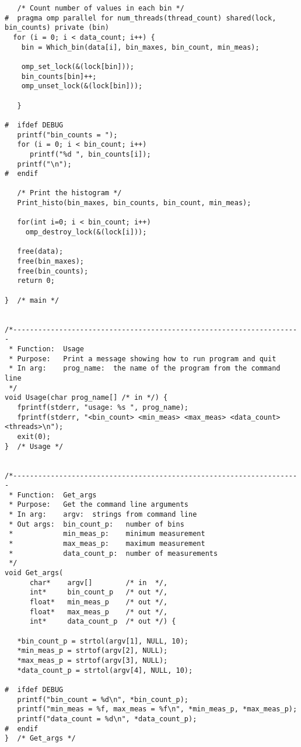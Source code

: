 \documentclass[a4paper,11pt,twoside]{article}
\begin{document}
\begin{verbatim}
   /* Count number of values in each bin */
#  pragma omp parallel for num_threads(thread_count) shared(lock, bin_counts) private (bin)
  for (i = 0; i < data_count; i++) {
    bin = Which_bin(data[i], bin_maxes, bin_count, min_meas);

    omp_set_lock(&(lock[bin])); 
    bin_counts[bin]++;
    omp_unset_lock(&(lock[bin]));
       
   }

#  ifdef DEBUG
   printf("bin_counts = ");
   for (i = 0; i < bin_count; i++)
      printf("%d ", bin_counts[i]);
   printf("\n");
#  endif

   /* Print the histogram */
   Print_histo(bin_maxes, bin_counts, bin_count, min_meas);

   for(int i=0; i < bin_count; i++)
     omp_destroy_lock(&(lock[i]));

   free(data);
   free(bin_maxes);
   free(bin_counts);
   return 0;

}  /* main */


/*---------------------------------------------------------------------
 * Function:  Usage 
 * Purpose:   Print a message showing how to run program and quit
 * In arg:    prog_name:  the name of the program from the command line
 */
void Usage(char prog_name[] /* in */) {
   fprintf(stderr, "usage: %s ", prog_name); 
   fprintf(stderr, "<bin_count> <min_meas> <max_meas> <data_count> <threads>\n");
   exit(0);
}  /* Usage */


/*---------------------------------------------------------------------
 * Function:  Get_args
 * Purpose:   Get the command line arguments
 * In arg:    argv:  strings from command line
 * Out args:  bin_count_p:   number of bins
 *            min_meas_p:    minimum measurement
 *            max_meas_p:    maximum measurement
 *            data_count_p:  number of measurements
 */
void Get_args(
      char*    argv[]        /* in  */,
      int*     bin_count_p   /* out */,
      float*   min_meas_p    /* out */,
      float*   max_meas_p    /* out */,
      int*     data_count_p  /* out */) {

   *bin_count_p = strtol(argv[1], NULL, 10);
   *min_meas_p = strtof(argv[2], NULL);
   *max_meas_p = strtof(argv[3], NULL);
   *data_count_p = strtol(argv[4], NULL, 10);

#  ifdef DEBUG
   printf("bin_count = %d\n", *bin_count_p);
   printf("min_meas = %f, max_meas = %f\n", *min_meas_p, *max_meas_p);
   printf("data_count = %d\n", *data_count_p);
#  endif
}  /* Get_args */



\end{verbatim}
\end{document}
